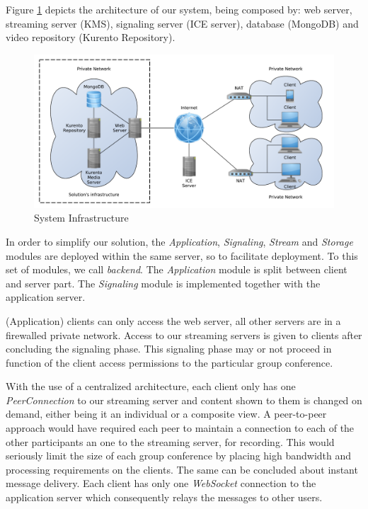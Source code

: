 \documentclass[10pt,conference]{IEEEtran}
\begin{document}
Figure \ref{fig:infrastructure} depicts the architecture of our system, being composed by: web server, streaming server (\gls{KMS}), signaling server (\gls{ICE} server), database (MongoDB) and video repository (Kurento Repository).

\begin{figure}
	\centering
	\includegraphics[width=\linewidth]{figures/infrastructure.pdf}
	\caption{System Infrastructure}
        \label{fig:infrastructure}
\end{figure}

In order to simplify our solution, the \emph{Application}, \emph{Signaling}, \emph{Stream} and \emph{Storage} modules are deployed within the same  server, so to facilitate deployment.
To this set of modules, we call \emph{backend}.
The \emph{Application} module is split between client and server part.
The \emph{Signaling} module is implemented together with the application server.

(Application) clients can only access the web server, all other servers are in a firewalled private network.
Access to our streaming servers is given to clients after concluding the signaling phase.
This signaling phase may or not proceed in function of the client access permissions to the particular group conference.

With the use of a centralized architecture, each client only has one \emph{PeerConnection} to our streaming server and content shown to them is changed on demand, either being it an individual or a composite view. 
A peer-to-peer approach would have required each peer to maintain a connection to each of the other participants an one to the streaming server, for recording.
This would seriously limit the size of each group conference by placing high bandwidth and processing requirements on the clients. 
The same can be concluded about instant message delivery.
Each client has only one \emph{WebSocket} connection to the application server which consequently relays the messages to other users.
\end{document}
